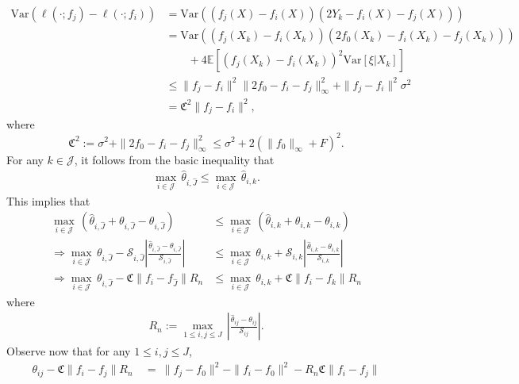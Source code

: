\documentclass[12pt]{article}
\begin{document}
\begin{appendices}
\begin{align*}
\mbox{Var}(\ell(\cdot; f_j) - \ell(\cdot; f_i)) &= \mbox{Var}((f_j(X) - f_i(X))(2Y_k - f_i(X) - f_j(X)))\\
&= \mbox{Var}((f_j(X_k) - f_i(X_k))(2f_0(X_k) - f_i(X_k) - f_j(X_k))) \\
&\qquad + 4\mathbb{E}[(f_j(X_k) - f_i(X_k))^2\mbox{Var}[\xi|X_k]]\\
&\le \|f_j - f_i\|^2\|2f_0 - f_i - f_j\|_{\infty}^2 + \|f_j - f_i\|^2\sigma^2\\
&= \mathfrak{C}^2\|f_j - f_i\|^2,
\end{align*}
where
\[
\mathfrak{C}^2 := \sigma^2 + \|2f_0 - f_i - f_j\|_{\infty}^2 \le \sigma^2  + 2(\|f_0\|_\infty + F)^2.
\]
For any $k \in \mathcal{J}$, it follows from the basic inequality that
\begin{align*}
    \max_{i \in \mathcal{J}} \,\widehat \theta_{i,\widehat J} \le \max_{i \in \mathcal{J}} \,\widehat \theta_{i, k}.
\end{align*}
This implies that 
\begin{equation}\label{eq:algebraic-manipulation}
    \begin{aligned}
        \max_{i \in \mathcal{J}} \,\left(\widehat \theta_{i,\widehat J} + \theta_{i,\widehat J}- \theta_{i,\widehat J}\right) &\le \max_{i \in \mathcal{J}} \, \left(\widehat \theta_{i, k} + \theta_{i,k}- \theta_{i,k} \right)\\
    \Rightarrow \max_{i \in \mathcal{J}} \,\theta_{i,\widehat J}-\mathcal{S}_{i,\widehat J}\left|\frac{\widehat \theta_{i,\widehat J}  - \theta_{i,\widehat J}}{\mathcal{S}_{i,\widehat J}}\right| &\le \max_{i \in \mathcal{J}} \,  \theta_{i,k}+\mathcal{S}_{i,k}\left|\frac{\widehat \theta_{i, k}- \theta_{i,k}}{\mathcal{S}_{i,k}}\right|\\
    \Rightarrow \max_{i \in \mathcal{J}} \,\theta_{i,\widehat J}-\mathfrak{C}\|f_i-f_{\widehat J}\|R_{n}& \le \max_{i \in \mathcal{J}} \,  \theta_{i,k}+\mathfrak{C}\|f_i - f_k\|R_{n}
    \end{aligned}
\end{equation}
where 
\begin{align*}
    R_{n} := \max_{1\le i, j\le J}\, \left|\frac{\widehat{\theta}_{ij} - \theta_{ij}}{\mathcal{S}_{ij}}\right|.
\end{align*}
Observe now that for any $1 \le i, j \le J$,
\begin{align*}
    \theta_{i j} - \mathfrak{C}\|f_i - f_j\|R_n~&=~ \| f_j - f_0 \|^2 - \| f_i - f_0 \|^2 - R_n \mathfrak{C} \| f_i - f_j \| \\

\end{align*}
\end{appendices}
\end{document}
